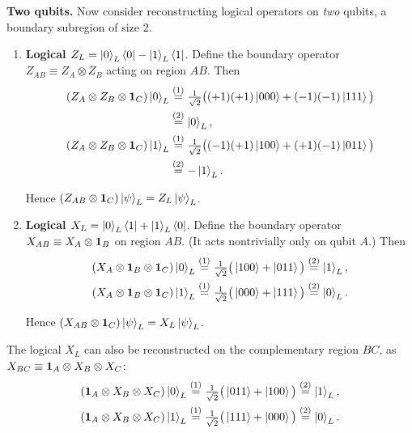 \textbf{Two qubits.} Now consider reconstructing logical operators on \emph{two} qubits, a boundary subregion
of size 2.
\begin{enumerate}
\item \textbf{Logical $Z_L = \ket{0}_L\bra{0} - \ket{1}_L\bra{1}$}.
Define the boundary operator $Z_{AB} \equiv Z_A \otimes Z_B$ acting on region $AB$. Then
\begin{align}
(Z_A \otimes Z_B \otimes \mathbf{1}_C)\ket{0}_L &\overset{(1)}{=} \tfrac{1}{\sqrt{2}}\big( (+1)(+1)\ket{000}
+ (-1)(-1)\ket{111}\big) \notag\\
&\overset{(2)}{=} \ket{0}_L , \notag\\
(Z_A \otimes Z_B \otimes \mathbf{1}_C)\ket{1}_L &\overset{(1)}{=} \tfrac{1}{\sqrt{2}}\big( (-1)(+1)\ket{100}
+ (+1)(-1)\ket{011}\big) \notag\\
&\overset{(2)}{=} -\ket{1}_L . \notag
\end{align}
\quad
{}

Hence $(Z_{AB} \otimes \mathbf{1}_C)\ket{\psi}_L = Z_L\ket{\psi}_L$.
\item \textbf{Logical $X_L = \ket{0}_L\bra{1} + \ket{1}_L\bra{0}$}.
Define the boundary operator $X_{AB} \equiv X_A \otimes \mathbf{1}_B$ on region $AB$. (It acts nontrivially only on
qubit $A$.) Then
\begin{align}
(X_A \otimes \mathbf{1}_B \otimes \mathbf{1}_C)\ket{0}_L &\overset{(1)}{=} \tfrac{1}{\sqrt{2}}\big(\ket{100} + \ket{011}\big)
\overset{(2)}{=} \ket{1}_L , \notag\\
(X_A \otimes \mathbf{1}_B \otimes \mathbf{1}_C)\ket{1}_L &\overset{(1)}{=} \tfrac{1}{\sqrt{2}}\big(\ket{000} + \ket{111}\big)
\overset{(2)}{=} \ket{0}_L . \notag
\end{align}
\quad
{}

Hence $(X_{AB} \otimes \mathbf{1}_C)\ket{\psi}_L = X_L\ket{\psi}_L$.
\end{enumerate}

The logical $X_L$ can also be reconstructed on the complementary region $BC$, as
$X_{BC} \equiv \mathbf{1}_A \otimes X_B \otimes X_C$:
\begin{align}
(\mathbf{1}_A \otimes X_B \otimes X_C)\ket{0}_L &\overset{(1)}{=} \tfrac{1}{\sqrt{2}}\big(\ket{011} + \ket{100}\big)
\overset{(2)}{=} \ket{1}_L , \notag\\
(\mathbf{1}_A \otimes X_B \otimes X_C)\ket{1}_L &\overset{(1)}{=} \tfrac{1}{\sqrt{2}}\big(\ket{111} + \ket{000}\big)
\overset{(2)}{=} \ket{0}_L . \notag
\end{align}
\quad
{}

